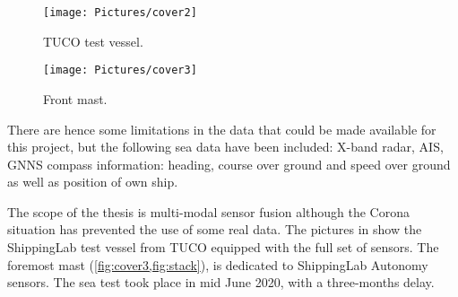 \begin{figure}[h!]
	\centering
	\captionsetup{width=0.45\textwidth}
	\begin{minipage}{0.49\textwidth}
		\centering
		\texttt{[image: Pictures/cover2]}
		\caption{TUCO test vessel.}\label{fig:cover2}
	\end{minipage}
	\begin{minipage}{0.49\textwidth}
		\centering
		\texttt{[image: Pictures/cover3]}
		\caption{Front mast.}\label{fig:cover3}
	\end{minipage}
\end{figure}


There are hence some limitations in the data that could be made available for this project, but the following sea data have been included: X-band radar, AIS, GNNS compass information: heading, course over ground and speed over ground as well as position of own ship.

The scope of the thesis is multi-modal sensor fusion although the Corona situation has prevented the use of some real data. 
The pictures in  show the ShippingLab test vessel from TUCO equipped with the full set of sensors. The foremost mast (\cref{fig:cover3,fig:stack}), is dedicated to ShippingLab Autonomy sensors. The sea test took place in mid June 2020, with a three-months delay.





%
%


